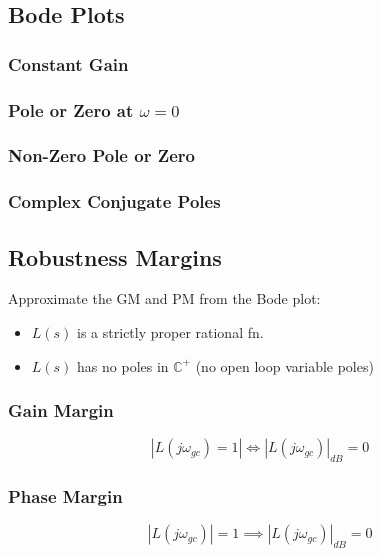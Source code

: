 \subsection{Bode Plots}
\begin{process}

\end{process}

\subsubsection{Constant Gain}

\subsubsection{Pole or Zero at $\omega=0$}

\subsubsection{Non-Zero Pole or Zero}

\subsubsection{Complex Conjugate Poles}

\subsection{Robustness Margins}
\begin{motivation}
    Approximate the GM and PM from the Bode plot: 
    \begin{itemize}
        \item $L(s)$ is a strictly proper rational fn. 
        \item $L(s)$ has no poles in $\mathbb{C}^+$ (no open loop variable poles)
    \end{itemize}
\end{motivation}

\subsubsection{Gain Margin}
\begin{definition}
    \begin{equation*}
        |L(j \omega_{gc}) = 1| \iff |L(j \omega_{gc})|_{dB} = 0
    \end{equation*}
\end{definition}

\subsubsection{Phase Margin}
\begin{definition}
    \begin{equation*}
        |L(j \omega_{gc})| = 1 \implies |L(j \omega_{gc})|_{dB} = 0
    \end{equation*}
\end{definition}